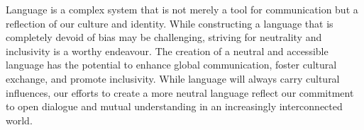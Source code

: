 Language is a complex system that is not merely a tool for communication but a reflection of our culture and identity. While constructing a language that is completely devoid of bias may be challenging, striving for neutrality and inclusivity is a worthy endeavour. The creation of a neutral and accessible language has the potential to enhance global communication, foster cultural exchange, and promote inclusivity. While language will always carry cultural influences, our efforts to create a more neutral language reflect our commitment to open dialogue and mutual understanding in an increasingly interconnected world. 
